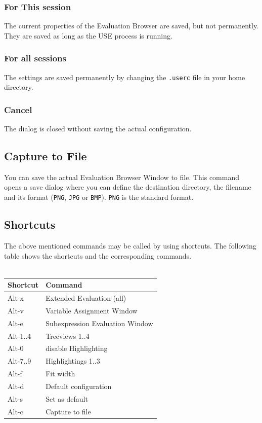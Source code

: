 \documentclass[a4paper,titlepage,oneside,final]{scrreprt} %
\begin{document}
\subsubsection{For This session}
The current properties of the Evaluation Browser are saved, but not permanently.
They are saved as long as the USE process is running.
\subsubsection{For all sessions}
The settings are saved permanently by changing the \verb+.userc+ file
in your home directory.
\subsubsection{Cancel}
The dialog is closed without saving the actual configuration.
\subsection{Capture to File}
You can save the actual Evaluation Browser Window to file.
This command opens a save dialog where you can define the destination directory, the filename and
its format (\verb+PNG+, \verb+JPG+ or \verb+BMP+). \verb+PNG+ is the standard format.
\subsection{Shortcuts}
The above mentioned commands may be called by using shortcuts. The following
table shows the shortcuts and the corresponding commands.\\\\
\begin{tabular}{l|l}
{\bf Shortcut} & {\bf Command}\\\hline
Alt-x & Extended Evaluation (all)\\
Alt-v & Variable Assignment Window\\
Alt-e & Subexpression Evaluation Window\\
Alt-1..4 & Treeviews 1..4\\
Alt-0 & disable Highlighting\\
Alt-7..9 & Highlightings 1..3\\
Alt-f & Fit width\\
Alt-d & Default configuration\\
Alt-s & Set as default\\
Alt-c & Capture to file
\end{tabular}
\end{document}
